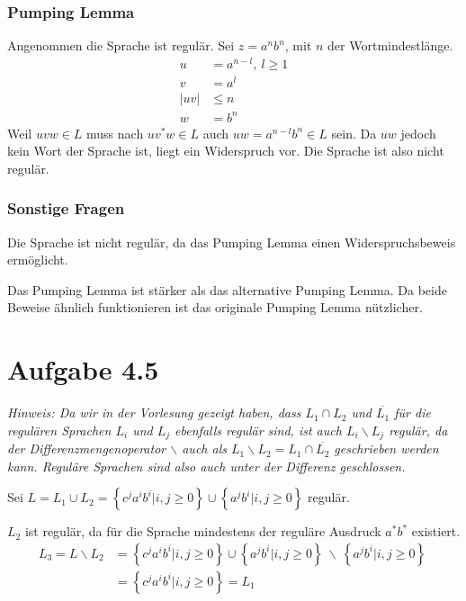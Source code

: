 \documentclass{article}
\begin{document}
\subsubsection*{Pumping Lemma}
Angenommen die Sprache ist regulär. Sei $z = a^nb^n$, mit $n$ der Wortmindestlänge. 
\setcounter{equation}{0}
\begin{align}
   u &= a^{n-l},\ l \geq 1 \\
   v &= a^l \\
|uv| &\leq n \\
   w &= b^n
\end{align}
Weil $uvw \in L$ muss nach $uv^*w \in L$ auch $uw = a^{n-l}b^n \in L$ sein. Da $uw$ jedoch kein Wort der Sprache ist, liegt ein Widerspruch vor. Die Sprache ist also nicht regulär.

\subsubsection*{Sonstige Fragen}
Die Sprache ist nicht regulär, da das Pumping Lemma einen Widerspruchsbeweis ermöglicht.

Das Pumping Lemma ist stärker als das alternative Pumping Lemma. Da beide Beweise ähnlich funktionieren ist das originale Pumping Lemma nützlicher.



\section*{Aufgabe 4.5}
\textit{Hinweis: Da wir in der Vorlesung gezeigt haben, dass $L_1 \cap L_2$ und $\overline{L_1}$ für die regulären Sprachen $L_i$ und $L_j$ ebenfalls regulär sind, ist auch $L_i \backslash L_j$ regulär, da der Differenzmengenoperator $\backslash$ auch als $L_1 \backslash L_2 = L_1 \cap \overline{L_2}$ geschrieben werden kann. Reguläre Sprachen sind also auch unter der Differenz geschlossen.}

\vspace{1em}

Sei $L = L_1 \cup L_2 = \left\{c^ja^ib^i | i,j \geq 0 \right\} \cup \left\{ a^jb^i |i,j \geq 0 \right\}$ regulär.

$L_2$ ist regulär, da für die Sprache mindestens der reguläre Ausdruck $a^*b^*$ existiert.
\begin{align*}
L_3 = L \backslash L_2 &= \left\{c^ja^ib^i | i,j \geq 0 \right\} \cup \left\{ a^jb^i |i,j \geq 0 \right\}\ \backslash\ \left\{ a^jb^i |i,j \geq 0 \right\}\ \\
                       &= \left\{c^ja^ib^i | i,j \geq 0 \right\} = L_1
\end{align*}
\end{document}
